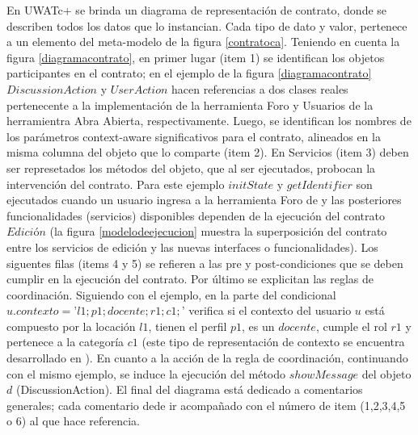 \documentclass[12 pt,a4paper]{llncs}
\begin{document}
En UWATc+ se brinda un diagrama de representación de contrato, donde se describen todos los datos que lo instancian. Cada tipo de dato y valor, pertenece a un elemento del meta-modelo de la figura \ref{contratoca}. Teniendo en cuenta la figura \ref{diagramacontrato}, en primer lugar (item 1) se identifican los objetos participantes en el contrato; en el ejemplo de la figura \ref{diagramacontrato} $DiscussionAction$ y $UserAction$ hacen referencias a dos clases reales pertenecente a la implementación de la herramienta Foro y Usuarios de la herramientra Abra Abierta, respectivamente. Luego, se identifican los nombres de los parámetros context-aware significativos para el contrato, alineados en la misma columna del objeto que lo comparte (item 2). En Servicios (item 3) deben ser represetados los métodos del objeto, que al ser ejecutados, probocan la intervención del contrato. Para este ejemplo $initState$ y $getIdentifier$  son ejecutados cuando un usuario ingresa a la herramienta Foro de y las posteriores funcionalidades (servicios) disponibles  dependen de la ejecución del contrato $Edición$ (la figura \ref{modelodeejecucion} muestra la superposición del contrato entre los servicios de edición y las nuevas interfaces o funcionalidades). Los siguentes filas (items 4 y 5) se refieren a las pre y post-condiciones que se deben cumplir en la ejecución del contrato. Por último se explicitan las reglas de coordinación. Siguiendo con el ejemplo, en la parte del condicional $u.contexto=’l1;p1;docente;r1;c1;’$ verifica si el contexto del usuario $u$ está compuesto por la locación $l1$, tienen el perfil $p1$, es un $docente$, cumple el rol $r1$ y pertenece a la categoría $c1$ (este tipo de representación de contexto se encuentra desarrollado en \cite{libro}). En cuanto a la acción de la regla de coordinación, continuando con el mismo ejemplo, se induce la ejecución del método $showMessage$ del objeto $d$ (DiscussionAction). El final del diagrama está dedicado a comentarios generales; cada comentario dede ir acompañado con el número de item (1,2,3,4,5 o 6) al que hace referencia. 
\end{document}
